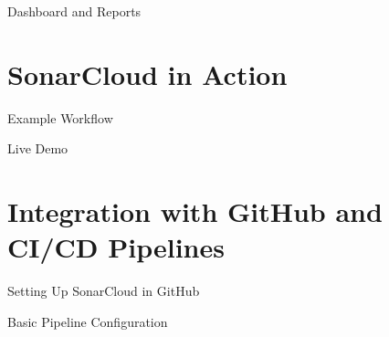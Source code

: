 \documentclass{beamer}
\begin{document}
\begin{frame}{Dashboard and Reports}
 
\end{frame}


\section[SonarCloud in Action]{SonarCloud in Action}

\begin{frame}{Example Workflow}

\end{frame}

\begin{frame}{Live Demo}
 
\end{frame}

\section[ Integration with GitHub and CI/CD Pipelines]{Integration with GitHub and CI/CD Pipelines}

\begin{frame}{Setting Up SonarCloud in GitHub}
 
\end{frame}

\begin{frame}{Basic Pipeline Configuration}
 
\end{frame}
\end{document}
